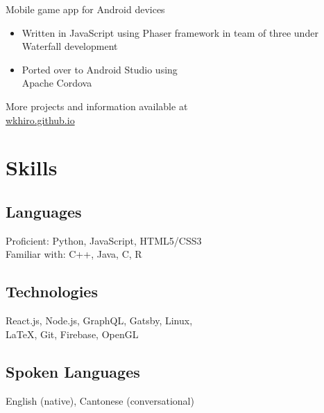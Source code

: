 \documentclass{article}
\begin{document}
\begin{paracol}{2}
{\color{NavyBlue} Mobile game app for Android devices}
\begin{itemize}[leftmargin=*]
	\itemsep0em 
	\item Written in JavaScript using Phaser framework in team of three under Waterfall development
	\item Ported over to Android Studio using 
\\\indent Apache Cordova
\end{itemize}

\vspace{0.5em}
{\noindent More projects and information available at \\
\href{https://wkhiro.github.io/}{\color{NavyBlue} wkhiro.github.io}}

\switchcolumn
\vspace{-2.5em}
\section{Skills}

\vspace{-0.5em}
\subsection{Languages} \hfill \vspace{0.5em}
	
	Proficient: Python, JavaScript, HTML5/CSS3\\
	\indent Familiar with: C++, Java, C, R
\vspace{-0.5em}
\subsection{Technologies} \hfill \vspace{0.5em}

	React.js, Node.js, GraphQL, Gatsby, Linux, \\\indent LaTeX, Git, Firebase, OpenGL
	
\vspace{-0.5em}
\subsection{Spoken Languages} \hfill \vspace{0.5em}

	English (native), Cantonese (conversational)
	

\end{paracol}
\end{document}
